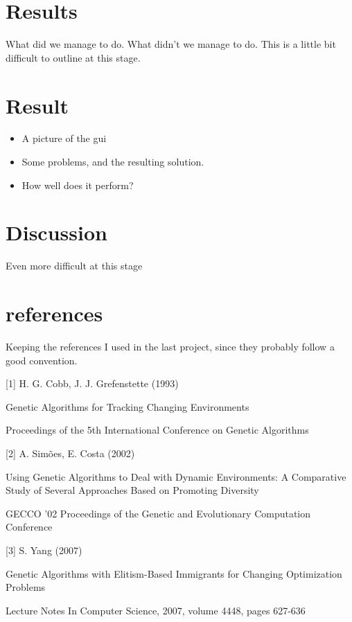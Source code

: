 \documentclass[a4paper,12pt]{article}
\begin{document}
\section{Results}
What did we manage to do. What didn't we manage to do. This is a little bit difficult to outline at this stage.

\section{Result}
\begin{itemize}
\item
A picture of the gui
\item
Some problems, and the resulting solution.
\item
How well does it perform?
\end{itemize}

\section{Discussion}
Even more difficult at this stage


\section{references}
Keeping the references I used in the last project, since they probably follow a good convention.

[1] H. G. Cobb, J. J. Grefenstette (1993)

Genetic Algorithms for Tracking Changing Environments

Proceedings of the 5th International Conference on Genetic Algorithms

[2] A. Simões, E. Costa (2002)

Using Genetic Algorithms to Deal with Dynamic Environments: A Comparative Study of Several Approaches Based on Promoting Diversity

GECCO '02 Proceedings of the Genetic and Evolutionary Computation Conference

[3] S. Yang (2007)

Genetic Algorithms with Elitism-Based Immigrants for Changing Optimization Problems

Lecture Notes In Computer Science, 2007, volume 4448, pages 627-636
\end{document}
